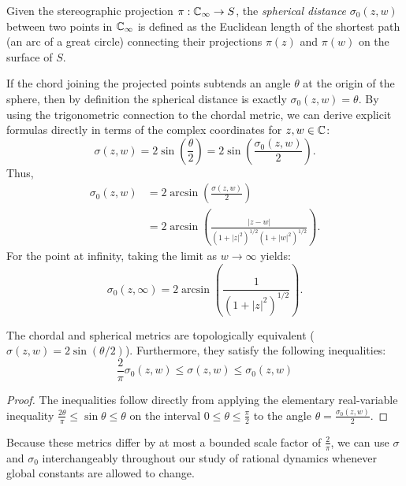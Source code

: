 \begin{definition}
    Given the stereographic projection $\pi: \mathbb{C}_\infty \to S$, the \emph{spherical
    distance} $\sigma_0(z,w)$ between two points in $\mathbb{C}_\infty$ is defined as the
    Euclidean length of the shortest path (an arc of a great circle) connecting
    their projections $\pi(z)$ and $\pi(w)$ on the surface of $S$.
\end{definition}

If the chord joining the projected points subtends an angle $\theta$ at the
origin of the sphere, then by definition the spherical distance is exactly
$\sigma_0(z,w) = \theta$. By using the trigonometric connection to the chordal
metric, we can derive explicit formulas directly in terms of the complex
coordinates for $z, w \in \mathbb{C}$:
\begin{equation*}
    \sigma(z,w) = 2 \sin\left( \frac{\theta}{2} \right) = 2 \sin\left( \frac{\sigma_0(z,w)}{2} \right).
\end{equation*}
Thus,
\begin{align*}
    \sigma_0(z,w) &= 2 \arcsin\left( \frac{\sigma(z,w)}{2} \right) \\
                  &= 2 \arcsin\left( \frac{|z-w|}{(1+|z|^2)^{1/2}(1+|w|^2)^{1/2}} \right).
\end{align*}
For the point at infinity, taking the limit as $w \to \infty$ yields:
\begin{equation*}
    \sigma_0(z,\infty) = 2 \arcsin\left( \frac{1}{(1+|z|^2)^{1/2}} \right).
\end{equation*}

\begin{remark}
    The chordal and spherical metrics are topologically equivalent ($\sigma(z,w)
    = 2 \sin(\theta/2)$). Furthermore, they satisfy the following inequalities:
    \begin{equation*}
        \frac{2}{\pi} \sigma_0(z,w) \le \sigma(z,w) \le \sigma_0(z,w)
    \end{equation*}
\end{remark}
\begin{proof}
    The inequalities follow directly from applying the elementary real-variable
    inequality $\frac{2\theta}{\pi} \le \sin\theta \le \theta$ on the interval
    $0 \le \theta \le \frac{\pi}{2}$ to the angle $\theta =
    \frac{\sigma_0(z,w)}{2}$.
\end{proof}

Because these metrics differ by at most a bounded scale factor of
$\frac{2}{\pi}$, we can use $\sigma$ and $\sigma_0$ interchangeably throughout
our study of rational dynamics whenever global constants are allowed to change.

